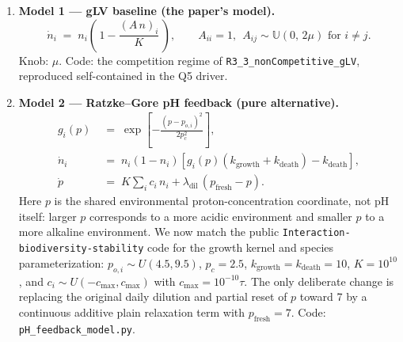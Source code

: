 \documentclass[11pt]{article}
\begin{document}
\begin{enumerate}[itemsep=6pt]
    \item \textbf{Model 1 --- gLV baseline (the paper's model).}
    \begin{equation*}
        \dot n_i \;=\; n_i \left(\, 1 - \frac{(A\, n)_i}{K} \,\right),
        \qquad A_{ii} = 1,\ \ A_{ij} \sim \mathbb{U}(0,\, 2\mu) \text{ for } i \neq j.
    \end{equation*}
    Knob: $\mu$. Code: the competition regime of \texttt{R3\_3\_nonCompetitive\_gLV}, reproduced self-contained in the Q5 driver.

    \item \textbf{Model 2 --- Ratzke--Gore pH feedback (pure alternative).}
    \begin{align*}
        g_i(p) &\;=\; \exp\!\left[-\frac{(p - p_{o,i})^2}{2p_c^2}\right], \\[2pt]
        \dot n_i &\;=\; n_i(1-n_i)\left[g_i(p)(k_{\mathrm{growth}}+k_{\mathrm{death}})-k_{\mathrm{death}}\right], \\[2pt]
        \dot p   &\;=\; K\sum_i c_i\,n_i
        + \lambda_{\mathrm{dil}}\,(p_{\mathrm{fresh}}-p).
    \end{align*}
    Here $p$ is the shared environmental proton-concentration coordinate, not pH itself: larger $p$ corresponds to a more acidic environment and smaller $p$ to a more alkaline environment. We now match the public \texttt{Interaction-biodiversity-stability} code for the growth kernel and species parameterization: $p_{o,i}\sim U(4.5,9.5)$, $p_c=2.5$, $k_{\mathrm{growth}}=k_{\mathrm{death}}=10$, $K=10^{10}$, and $c_i\sim U(-c_{\max},c_{\max})$ with $c_{\max}=10^{-10}\tau$. The only deliberate change is replacing the original daily dilution and partial reset of $p$ toward 7 by a continuous additive plain relaxation term with $p_{\mathrm{fresh}}=7$. Code: \texttt{pH\_feedback\_model.py}.


\end{enumerate}
\end{document}
